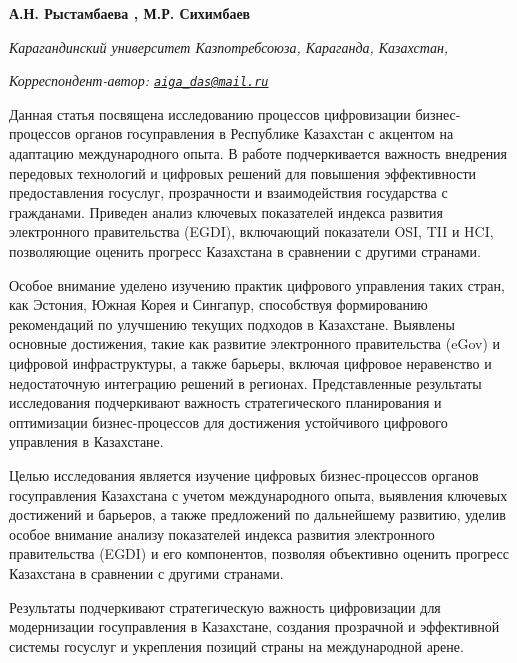 
\begin{articleheader}

{\bfseries  
А.Н. Рыстамбаева\textsuperscript{\envelope } \authorid,
М.Р. Сихимбаев\authorid}
\end{articleheader}

\begin{affiliation}
\emph{Карагандинский университет Казпотребсоюза, Караганда, Казахстан,}

\raggedright \textsuperscript{\envelope }{\em Корреспондент-автор: \href{mailto:aiga_das@mail.ru}{\nolinkurl{aiga\_das@mail.ru}}}
\end{affiliation}

Данная статья посвящена исследованию процессов цифровизации
бизнес-процессов органов госуправления в Республике Казахстан с акцентом
на адаптацию международного опыта. В работе подчеркивается важность
внедрения передовых технологий и цифровых решений для повышения
эффективности предоставления госуслуг, прозрачности и взаимодействия
государства с гражданами. Приведен анализ ключевых показателей индекса
развития электронного правительства (EGDI), включающий показатели OSI,
TII и HCI, позволяющие оценить прогресс Казахстана в сравнении с другими
странами.

Особое внимание уделено изучению практик цифрового управления таких
стран, как Эстония, Южная Корея и Сингапур, способствуя формированию
рекомендаций по улучшению текущих подходов в Казахстане. Выявлены
основные достижения, такие как развитие электронного правительства
(eGov) и цифровой инфраструктуры, а также барьеры, включая цифровое
неравенство и недостаточную интеграцию решений в регионах.
Представленные результаты исследования подчеркивают важность
стратегического планирования и оптимизации бизнес-процессов для
достижения устойчивого цифрового управления в Казахстане.

Целью исследования является изучение цифровых бизнес-процессов органов
госуправления Казахстана с учетом международного опыта, выявления
ключевых достижений и барьеров, а также предложений по дальнейшему
развитию, уделив особое внимание анализу показателей индекса развития
электронного правительства (EGDI) и его компонентов, позволяя объективно
оценить прогресс Казахстана в сравнении с другими странами.

Результаты подчеркивают стратегическую важность цифровизации для
модернизации госуправления в Казахстане, создания прозрачной и
эффективной системы госуслуг и укрепления позиций страны на
международной арене.

